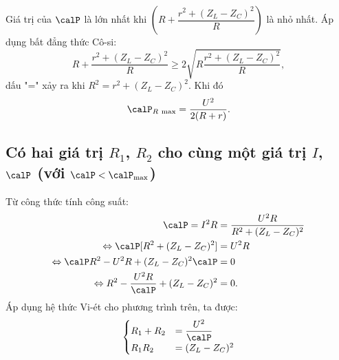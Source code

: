 Giá trị của $\calP$ là lớn nhất khi $\left(R+\dfrac{r^2+(Z_L-Z_C)^2}{R}\right)$ là nhỏ nhất. Áp dụng bất đẳng thức Cô-si:
\begin{equation*}
	R+\dfrac{r^2+(Z_L-Z_C)^2}{R} \geq 2\sqrt{R\dfrac{r^2+(Z_L-Z_C)^2}{R}},
\end{equation*}
dấu $\text{"="}$ xảy ra khi $R^2=r^2+(Z_L-Z_C)^2$.
Khi đó
\begin{equation*}
	\calP_{R\ \text{max}} = \dfrac{U^2}{2(R+r)}.
\end{equation*}

\subsection{Có hai giá trị $R_1$, $R_2$ cho cùng một giá trị $I$, $\calP$ (với $\calP < \calP_\text{max}$)}
Từ công thức tính công suất:
\begin{align*}
	\calP=I^2R&=\dfrac{U^2R}{R^2+(Z_L-Z_C)^2} \\
	\Leftrightarrow \calP[R^2+(Z_L-Z_C)^2] &= U^2 R \\
	\Leftrightarrow \calP R^2 - U^2R+(Z_L-Z_C)^2\calP&=0 \\
	\Leftrightarrow R^2 - \dfrac{U^2R}{\calP}+(Z_L-Z_C)^2&=0.
\end{align*}
Áp dụng hệ thức Vi-ét cho phương trình trên, ta được:
\begin{equation*}\begin{cases}
		R_1 + R_2 &= \dfrac{U^2}{\calP}\\
		R_1R_2&=(Z_L-Z_C)^2
	\end{cases}\end{equation*}

